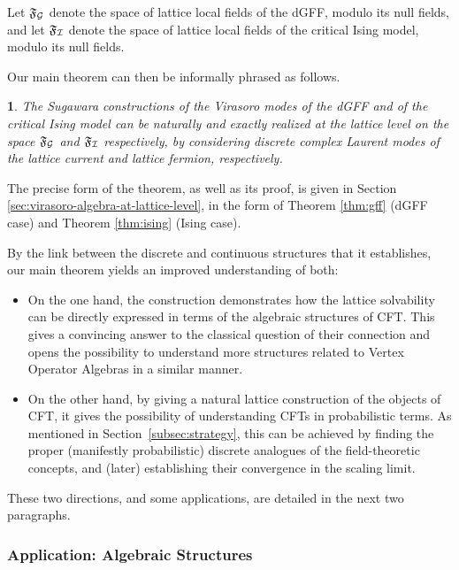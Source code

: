 \documentclass[12pt,oneside,english]{amsart}
\numberwithin{equation}{section}
\numberwithin{figure}{section}
\theoremstyle{plain}
\theoremstyle{plain}
\newtheorem*{thm*}{\protect\theoremname}
\theoremstyle{plain}
\theoremstyle{plain}
\theoremstyle{remark}
\theoremstyle{definition}
\theoremstyle{plain}
\theoremstyle{plain}
\numberwithin{thm}{section}
\providecommand{\theoremname}{Theorem}
\providecommand{\theoremname}{Theorem}
\providecommand{\theoremname}{Theorem}
\providecommand{\theoremname}{Theorem}
\begin{document}
Let $\mathfrak{F}_{\mathcal{G}}$ denote the space of lattice local
fields of the dGFF, modulo its null fields, and let $\mathfrak{F}_{\mathcal{I}}$
denote the space of lattice local fields of the critical Ising model,
modulo its null fields.

Our main theorem can then be informally phrased as follows. 
\begin{thm*}
The Sugawara constructions of the Virasoro modes
of the dGFF and of the critical Ising model can be naturally and exactly
realized at the lattice level on the space $\mathfrak{F}_{\mathcal{G}}$
and $\mathfrak{F}_{\mathcal{I}}$ respectively, by considering discrete
complex Laurent modes of the lattice current and lattice fermion,
respectively. 
\end{thm*}
The precise form of the theorem, as well as its proof, is given in
Section \ref{sec:virasoro-algebra-at-lattice-level}, in the form
of Theorem \ref{thm:gff} (dGFF case) and Theorem \ref{thm:ising}
(Ising case).

By the link between the discrete and continuous structures that it
establishes, %
our main theorem yields an improved understanding
of both: 
\begin{itemize}
\item On the one hand, the construction demonstrates how the lattice solvability
can be directly expressed in terms of the algebraic structures of
CFT. This gives a convincing answer to the classical question of their
connection \cite{itoyama-thacker} and opens the possibility to understand
more structures related to Vertex Operator Algebras in a similar manner. 
\item On the other hand, by giving a natural lattice construction of the
objects of CFT, it gives the possibility of understanding CFTs
in probabilistic terms. As mentioned in Section~\ref{subsec:strategy},
this can be achieved by finding the proper (manifestly probabilistic)
discrete analogues of the field-theoretic concepts, and (later) establishing
their convergence in the scaling limit. 
\end{itemize}
These two directions, and some applications, are detailed in the next
two paragraphs.

\subsubsection{Application: Algebraic Structures}
\end{document}
